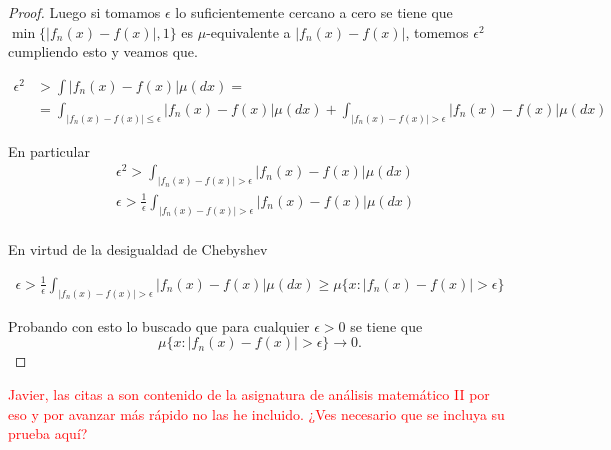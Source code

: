 \begin{proof}
    Luego si tomamos $\epsilon$ lo suficientemente cercano a cero  se tiene que $\min \{ |f_n(x) - f(x)|, 1\}$
    es $\mu$-equivalente a $|f_n(x) - f(x)|$, tomemos $\epsilon^2$ cumpliendo esto y veamos que.  

    \begin{equation}
        \begin{split}
            \epsilon^2 & >  \int |f_n(x) - f(x)|  \mu(dx) =  \\
            & =\int_{|f_n(x) - f(x)| \leq \epsilon } |f_n(x) - f(x)|  \mu(dx)
             + \int_{|f_n(x) - f(x)| > \epsilon } |f_n(x) - f(x)|  \mu(dx)  
        \end{split}
    \end{equation}


En particular 
\begin{equation}
    \begin{split}
        & \epsilon^2  > \int_{|f_n(x) - f(x)| > \epsilon } |f_n(x) - f(x)|  \mu(dx) \\
        &  \epsilon  > \frac{1}{\epsilon}\int_{|f_n(x) - f(x)| > \epsilon } |f_n(x) - f(x)|  \mu(dx) \\
    \end{split}
\end{equation}

En virtud de la desigualdad de Chebyshev 

\begin{equation}
    \begin{split}
          \epsilon  > \frac{1}{\epsilon}\int_{|f_n(x) - f(x)| > \epsilon } |f_n(x) - f(x)|  \mu(dx) 
          \geq \mu \{  x : |f_n(x) - f(x)| > \epsilon \} 
    \end{split}
\end{equation}

Probando con esto lo buscado que  para cualquier  $\epsilon > 0$ se tiene que 
$$\mu \{  x : |f_n(x) - f(x)| > \epsilon \} \longrightarrow 0.$$
\end{proof}


\textcolor{red}{Javier, las citas a \cite{nla.cat-vn1819421} son contenido de la 
asignatura de análisis matemático II por eso y por avanzar más rápido no las he incluido.
¿Ves necesario que se incluya su prueba aquí?}

